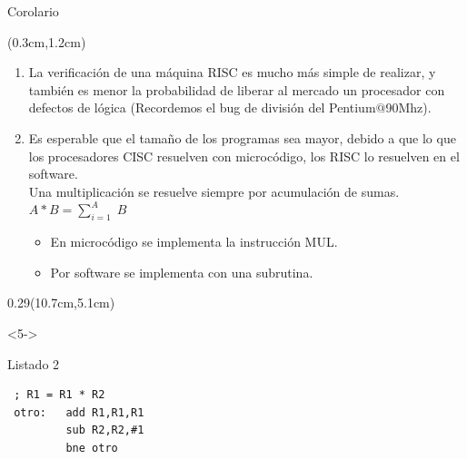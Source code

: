\documentclass[table,dvipsnames,aspectratio=169]{beamer}
\begin{document}
\begin{frame}[fragile]{Corolario}
 \begin{textblock*}{\textwidth}(0.3cm,1.2cm)
  \begin{enumerate}[<+(1)->]\justifying \parskip 0.2cm
   \item La \textcolor{furfiBlue}{verificación de una máquina RISC es mucho más simple de realizar}, y también es menor la probabilidad de liberar al mercado un procesador con defectos de lógica \textcolor{furfiBlue}{(Recordemos el bug de división del Pentium$@$90Mhz)}.
   \item Es esperable que el \textcolor{furfiBlue}{tamaño de los programas sea mayor}, debido a que lo que los procesadores CISC resuelven con microcódigo, los RISC lo resuelven en el software.\\
   Una multiplicación se resuelve siempre por acumulación de sumas.\\
   \centering $\displaystyle A*B = \sum_{i=1}^{A} \; B$
   \begin{itemize}
    \item En microcódigo se implementa la instrucción MUL.
    \item Por software se implementa con una subrutina.
   \end{itemize}
  \end{enumerate}
 \end{textblock*}
 \begin{textblock*}{0.29\textwidth}(10.7cm,5.1cm)
  \begin{onlyenv}<5->
   \begin{block}{Listado 2}
 \lstset{basicstyle=\footnotesize}
    \begin{lstlisting}
 ; R1 = R1 * R2
 otro:   add R1,R1,R1
         sub R2,R2,#1
         bne otro
     \end{lstlisting}
   \end{block}
  \end{onlyenv}
 \end{textblock*}
\end{frame}
  
\end{document}
